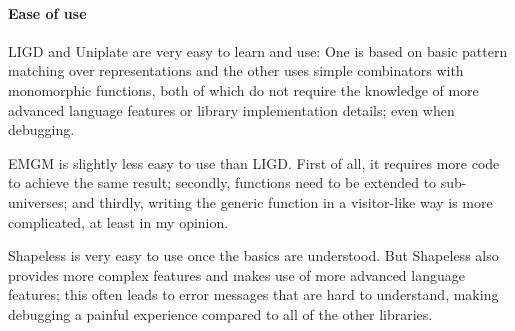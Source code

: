 \paragraph{Ease of use}
LIGD and Uniplate are very easy to learn and use: One is based on basic
pattern matching over representations and the other uses simple combinators
with monomorphic functions, both of which do not require the knowledge of
more advanced language features or library implementation details; even
when debugging.

EMGM is slightly less easy to use than LIGD. First of all, it requires more
code to achieve the same result; secondly, functions need to be extended to
sub-universes; and thirdly, writing the generic function in a visitor-like
way is more complicated, at least in my opinion.

Shapeless is very easy to use once the basics are understood. But Shapeless
also provides more complex features and makes use of more advanced language
features; this often leads to error messages that are hard to understand,
making debugging a painful experience compared to all of the other libraries.
